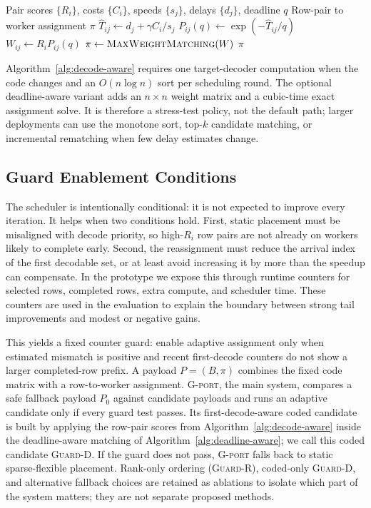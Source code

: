 \begin{algorithm}[t]
  \caption{Deadline-aware row-pair assignment}
  \label{alg:deadline-aware}
  \begin{algorithmic}[1]
    \Require Pair scores $\{R_i\}$, costs $\{C_i\}$, speeds $\{s_j\}$, delays $\{d_j\}$, deadline $q$
    \Ensure Row-pair to worker assignment $\pi$
      \State $\widehat{T}_{ij} \gets d_j + \gamma C_i / s_j$
      \State $P_{ij}(q) \gets \exp(-\widehat{T}_{ij}/q)$
      \State $W_{ij} \gets R_i P_{ij}(q)$
    \EndFor
    \State $\pi \gets \Call{MaxWeightMatching}{W}$ 
    \State \Return $\pi$
  \end{algorithmic}
\end{algorithm}

Algorithm~\ref{alg:decode-aware} requires one target-decoder computation when
the code changes and an $O(n\log n)$ sort per scheduling round.  The optional
deadline-aware variant adds an $n\times n$ weight matrix and a cubic-time exact
assignment solve.  It is therefore a stress-test policy, not the default path;
larger deployments can use the monotone sort, top-$k$ candidate matching, or
incremental rematching when few delay estimates change.

\subsection{Guard Enablement Conditions}

The scheduler is intentionally conditional: it is not expected to improve every
iteration.  It helps when two conditions hold.  First, static placement must be
misaligned with decode priority, so high-$R_i$ row pairs are not already on
workers likely to complete early.  Second, the reassignment must reduce the
arrival index of the first decodable set, or at least avoid increasing it by
more than the speedup can compensate.  In the prototype we expose this
through runtime counters for selected rows, completed rows, extra compute, and
scheduler time.  These counters are used in the evaluation to explain the
boundary between strong tail improvements and modest or negative gains.

This yields a fixed counter guard: enable adaptive assignment only when
estimated mismatch is positive and recent first-decode counters do not show a
larger completed-row prefix.  A payload $P=(B,\pi)$ combines the fixed code
matrix with a row-to-worker assignment.  \textsc{G-port}, the main system,
compares a safe fallback payload $P_0$ against candidate payloads and runs an
adaptive candidate only if every guard test passes.  Its
first-decode-aware coded
candidate is built by applying the row-pair scores from
Algorithm~\ref{alg:decode-aware} inside the deadline-aware matching of
Algorithm~\ref{alg:deadline-aware}; we call this coded candidate
\textsc{Guard-D}.  If the guard does not pass,
\textsc{G-port} falls back to static sparse-flexible placement.  Rank-only
ordering (\textsc{Guard-R}), coded-only \textsc{Guard-D}, and alternative
fallback choices are retained as ablations to isolate which part of the system
matters; they are not separate proposed methods.


